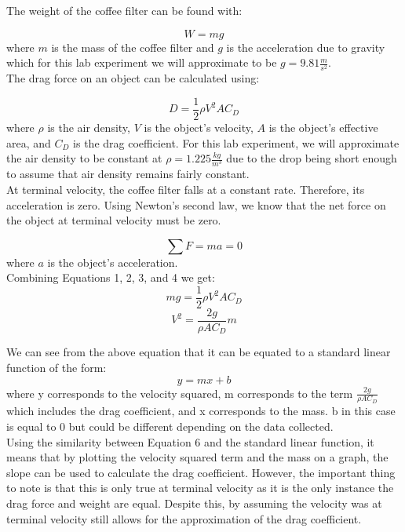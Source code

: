\documentclass[12pt]{report}
\begin{document}
\noindent The weight of the coffee filter can be found with:

\begin{equation}
	W = mg
\end{equation}
where $m$ is the mass of the coffee filter and $g$ is the acceleration due to gravity which for this lab experiment we will approximate to be $g = 9.81 \frac{m}{s^2}$.\\

\noindent The drag force on an object can be calculated using:

\begin{equation}
	D = \frac{1}{2}\rho V^2 A C_D
\end{equation}
where $\rho$ is the air density, $V$ is the object's velocity, $A$ is the object's effective area, and $C_D$ is the drag coefficient. For this lab experiment, we will approximate the air density to be constant at $\rho = 1.225 \frac{kg}{m^3}$ due to the drop being short enough to assume that air density remains fairly constant.\\

\noindent At terminal velocity, the coffee filter falls at a constant rate. Therefore, its acceleration is zero. Using Newton's second law, we know that the net force on the object at terminal velocity must be zero.

\begin{equation}
	\sum F = ma = 0
\end{equation}
where $a$ is the object's acceleration.\\

\noindent Combining Equations 1, 2, 3, and 4 we get:
\begin{equation}
	mg = \frac{1}{2}\rho V^2 A C_D
\end{equation}
\begin{equation}
	V^2 = \frac{2g}{\rho A C_D} m
\end{equation}

\noindent We can see from the above equation that it can be equated to a standard linear function of the form:
\begin{equation}
	y = mx + b
\end{equation}
where y corresponds to the velocity squared, m corresponds to the term $\frac{2g}{\rho A C_D}$ which includes the drag coefficient, and x corresponds to the mass. b in this case is equal to 0 but could be different depending on the data collected.\\

\noindent Using the similarity between Equation 6 and the standard linear function, it means that by plotting the velocity squared term and the mass on a graph, the slope can be used to calculate the drag coefficient. However, the important thing to note is that this is only true at terminal velocity as it is the only instance the drag force and weight are equal. Despite this, by assuming the velocity was at terminal velocity still allows for the approximation of the drag coefficient.\\
\end{document}
